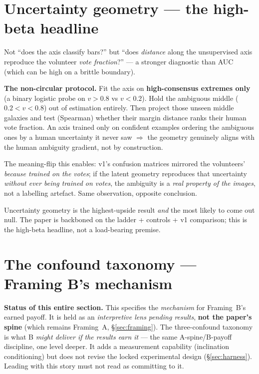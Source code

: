 \documentclass[11pt,a4paper]{article}
\begin{document}
\section{Uncertainty geometry --- the high-beta headline}\label{sec:uncertainty}


Not ``does the axis classify bars?'' but ``does \emph{distance} along the unsupervised axis
reproduce the volunteer \emph{vote fraction}?'' --- a stronger diagnostic than AUC (which can be
high on a brittle boundary).

\begin{decidedbox}
\textbf{The non-circular protocol.} Fit the axis on \textbf{high-consensus extremes only} (a
binary logistic probe on $v>0.8$ vs $v<0.2$). Hold the ambiguous middle ($0.2<v<0.8$) out of
estimation entirely. Then project those unseen middle galaxies and test (Spearman) whether
their margin distance ranks their human vote fraction. An axis trained only on confident
examples ordering the ambiguous ones by a human uncertainty it never saw $\Rightarrow$ the
geometry genuinely aligns with the human ambiguity gradient, not by construction.
\end{decidedbox}

The meaning-flip this enables: v1's confusion matrices mirrored the volunteers' \emph{because
trained on the votes}; if the latent geometry reproduces that uncertainty \emph{without ever
being trained on votes}, the ambiguity is a \emph{real property of the images}, not a labelling
artefact. Same observation, opposite conclusion.

\begin{deferredbox}
Uncertainty geometry is the highest-upside result \emph{and} the most likely to come out null.
The paper is backboned on the ladder + controls + v1 comparison; this is the high-beta
headline, not a load-bearing premise.
\end{deferredbox}

\section{The confound taxonomy --- Framing B's mechanism}\label{sec:confound}

\begin{deferredbox}
\textbf{Status of this entire section.} This specifies the \emph{mechanism} for Framing~B's
earned payoff. It is held as an \emph{interpretive lens pending results}, \textbf{not the
paper's spine} (which remains Framing~A, \S\ref{sec:framing}). The three-confound taxonomy is
what B \emph{might deliver if the results earn it} --- the same A-spine/B-payoff discipline,
one level deeper. It adds a measurement capability (inclination conditioning) but does not
revise the locked experimental design (\S\ref{sec:harness}). Leading with this story must not
read as committing to it.
\end{deferredbox}
\end{document}
